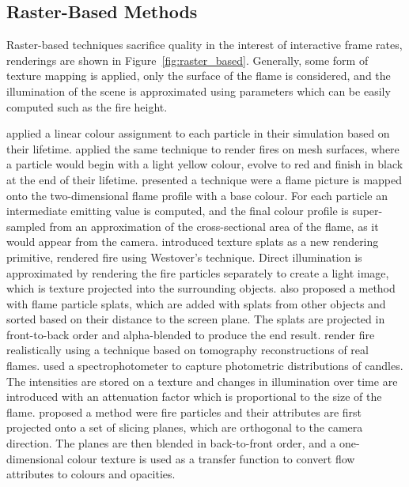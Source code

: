 \subsection{Raster-Based Methods}
\label{sec:raster_based}

Raster-based techniques sacrifice quality in the interest of interactive frame rates, renderings are shown in Figure~\ref{fig:raster_based}.
Generally, some form of texture mapping is applied, only the surface of the flame is considered, and the illumination of the scene is approximated using parameters which can be easily computed such as the fire height.

\cite{Reeves:1983} applied a linear colour assignment to each particle in their simulation based on their lifetime.
\cite{Lee:2001} applied the same technique to render fires on mesh surfaces, where a particle would begin with a light yellow colour, evolve to red and finish in black at the end of their lifetime.
\cite{Lamorlette:2002} presented a technique were a flame picture is mapped onto the two-dimensional flame profile with a base colour.
For each particle an intermediate emitting value is computed, and the final colour profile is super-sampled from an approximation of the cross-sectional area of the flame, as it would appear from the camera.
\cite{Westover:1990} introduced texture splats as a new rendering primitive, \cite{Wei:2002} rendered fire using Westover's technique.
Direct illumination is approximated by rendering the fire particles separately to create a light image, which is texture projected into the surrounding objects.
\cite{Zhao:2003} also proposed a method with flame particle splats, which are added with splats from other objects and sorted based on their distance to the screen plane.
The splats are projected in front-to-back order and alpha-blended to produce the end result.
\cite{Ihrke:2004} render fire realistically using a technique based on tomography reconstructions of real flames. 
\cite{Bridault:2006} used a spectrophotometer to capture photometric distributions of candles.
The intensities are stored on a texture and changes in illumination over time are introduced with an attenuation factor which is proportional to the size of the flame.
\cite{Zhang:2011} proposed a method were fire particles and their attributes are first projected onto a set of slicing planes, which are orthogonal to the camera direction. 
The planes are then blended in back-to-front order, and a one-dimensional colour texture is used as a transfer function to convert flow attributes to colours and opacities.


